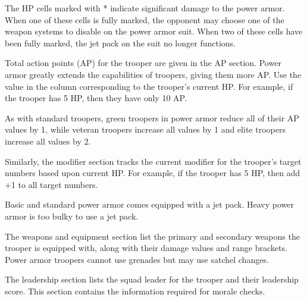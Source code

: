The HP cells marked with * indicate significant damage to the power armor.
When one of these cells is fully marked, the opponent may choose one of the weapon systems to disable on the power armor suit.
When two of these cells have been fully marked, the jet pack on the suit no longer functions.

Total action points (AP) for the trooper are given in the AP section.
Power armor greatly extends the capabilities of troopers, giving them more AP.
Use the value in the column corresponding to the trooper's current HP.
For example, if the trooper has 5 HP, then they have only 10 AP.

As with standard troopers, green troopers in power armor reduce all of their AP values by 1, while veteran troopers increase all values by 1 and elite troopers increase all values by 2.

Similarly, the modifier section tracks the current modifier for the trooper's target numbers based upon current HP.
For example, if the trooper has 5 HP, then add +1 to all target numbers.

Basic and standard power armor comes equipped with a jet pack.
Heavy power armor is too bulky to use a jet pack.

The weapons and equipment section list the primary and secondary weapons the trooper is equipped with, along with their damage values and range brackets.
Power armor troopers cannot use grenades but may use satchel changes.

The leadership section lists the squad leader for the trooper and their leadership score.
This section contains the information required for morale checks.
